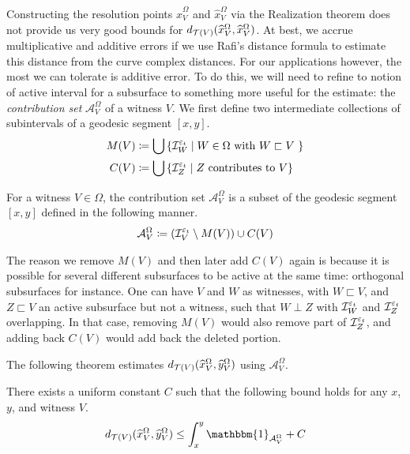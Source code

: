 Constructing the resolution points $\widehat{x}_V^{\Omega}$ and $\widehat{x}_V^{\Omega}$ via the Realization theorem does not provide us very good bounds for $d_{\mathcal{T}(V)}(\widehat{x}_V^{\Omega}, \widehat{x}_V^{\Omega})$.
At best, we accrue multiplicative and additive errors if we use Rafi's distance formula to estimate this distance from the curve complex distances.
For our applications however, the most we can tolerate is additive error.
To do this, we will need to refine to notion of active interval for a subsurface to something more useful for the estimate: the \emph{contribution set} $\mathcal{A}_V^{\Omega}$ of a witness $V$.
We first define two intermediate collections of subintervals of a geodesic segment $[x,y]$.
\begin{align*}
  M(V) &\coloneqq \bigcup \left\{ \mathcal{I}_W^{{\varepsilon_t}} \mid \text{$W \in \Omega$ with $W \sqsubset V$ }  \right\} \\
  C(V) &\coloneqq \bigcup \left\{ \mathcal{I}_Z^{{\varepsilon_t}} \mid \text{$Z$ contributes to $V$} \right\}
\end{align*}

\begin{definition}
  For a witness $V \in \Omega$, the contribution set $\mathcal{A}_V^{\Omega}$ is a subset of the geodesic segment $[x,y]$ defined in the following manner.
  \begin{align*}
    \mathcal{A}_V^{\Omega} \coloneqq \left( \mathcal{I}_V^{\varepsilon_t} \setminus M(V) \right) \cup C(V)
  \end{align*}
\end{definition}
\begin{remark}
  The reason we remove $M(V)$ and then later add $C(V)$ again is because it is possible for several different subsurfaces to be active at the same time: orthogonal subsurfaces for instance.
  One can have $V$ and $W$ as witnesses, with $W \sqsubset V$, and $Z \sqsubset V$ an active subsurface but not a witness, such that $W \perp Z$ with $\mathcal{I}_W^{\varepsilon_t}$ and $\mathcal{I}_Z^{\varepsilon_t}$ overlapping.
  In that case, removing $M(V)$ would also remove part of $\mathcal{I}_Z^{\varepsilon_t}$, and adding back $C(V)$ would add back the deleted portion.
\end{remark}

The following theorem estimates $d_{\mathcal{T}(V)}(\widehat{x}_V^{\Omega}, \widehat{y}_V^{\Omega})$ using $\mathcal{A}_V^{\Omega}$.
\begin{theorem}
  \label{thm:contribution-set-resolution-distance}
  There exists a uniform constant $C$ such that the following bound holds for any $x$, $y$, and witness $V$.
  \begin{align*}
d_{\teich(V)}(\widehat{x}_V^{\Omega}, \widehat{y}_V^{\Omega}) \leq \int_x^y \mathbbm{1}_{\mathcal{A}_V^{\Omega}} + C
  \end{align*}
\end{theorem}

